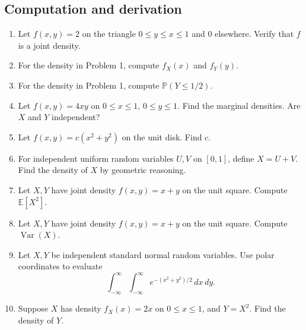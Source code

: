 \documentclass[11pt,oneside]{book}
\newcommand{\E}{\mathbb E}
\newcommand{\Prob}{\mathbb P}
\newcommand{\Var}{\operatorname{Var}}
\newcommand{\dd}{\,d}
\begin{document}
\subsection*{Computation and derivation}
\begin{enumerate}
  \item Let $f(x,y)=2$ on the triangle $0\le y\le x\le 1$ and $0$ elsewhere. Verify that $f$ is a joint density.
  \item For the density in Problem 1, compute $f_X(x)$ and $f_Y(y)$.
  \item For the density in Problem 1, compute $\Prob(Y\le 1/2)$.
  \item Let $f(x,y)=4xy$ on $0\le x\le 1$, $0\le y\le 1$. Find the marginal densities. Are $X$ and $Y$ independent?
  \item Let $f(x,y)=c(x^2+y^2)$ on the unit disk. Find $c$.
  \item For independent uniform random variables $U,V$ on $[0,1]$, define $X=U+V$. Find the density of $X$ by geometric reasoning.
  \item Let $X,Y$ have joint density $f(x,y)=x+y$ on the unit square. Compute $\E[X^2]$.
  \item Let $X,Y$ have joint density $f(x,y)=x+y$ on the unit square. Compute $\Var(X)$.
  \item Let $X,Y$ be independent standard normal random variables. Use polar coordinates to evaluate
  \[
  \int_{-\infty}^{\infty}\int_{-\infty}^{\infty}e^{-(x^2+y^2)/2}\dd x\dd y.
  \]
  \item Suppose $X$ has density $f_X(x)=2x$ on $0\le x\le 1$, and $Y=X^2$. Find the density of $Y$.
\end{enumerate}
\end{document}

